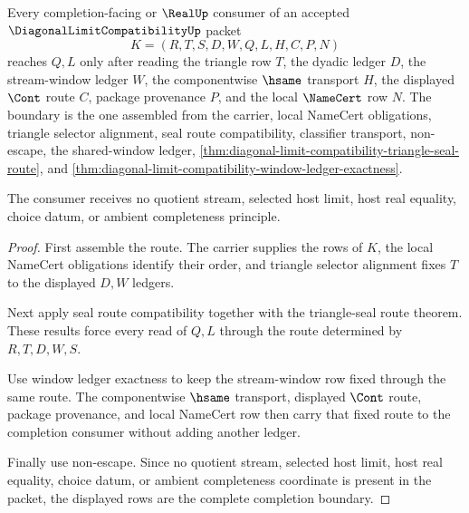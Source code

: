 \begin{theorem}
\label{thm:diagonal-limit-compatibility-completion-boundary}
Every completion-facing or $\RealUp$ consumer of an accepted $\DiagonalLimitCompatibilityUp$ packet
$$
K=(R,T,S,D,W,Q,L,H,C,P,N)
$$
reaches $Q,L$ only after reading the triangle row $T$, the dyadic ledger $D$, the stream-window ledger $W$, the componentwise $\hsame$ transport $H$, the displayed $\Cont$ route $C$, package provenance $P$, and the local $\NameCert$ row $N$. The boundary is the one assembled from the carrier, local NameCert obligations, triangle selector alignment, seal route compatibility, classifier transport, non-escape, the shared-window ledger, \autoref{thm:diagonal-limit-compatibility-triangle-seal-route}, and \autoref{thm:diagonal-limit-compatibility-window-ledger-exactness}.

The consumer receives no quotient stream, selected host limit, host real equality, choice datum, or ambient completeness principle.
\end{theorem}
\begin{proof}
First assemble the route. The carrier supplies the rows of $K$, the local NameCert obligations identify their order, and triangle selector alignment fixes $T$ to the displayed $D,W$ ledgers.

Next apply seal route compatibility together with the triangle-seal route theorem. These results force every read of $Q,L$ through the route determined by $R,T,D,W,S$.

Use window ledger exactness to keep the stream-window row fixed through the same route. The componentwise $\hsame$ transport, displayed $\Cont$ route, package provenance, and local NameCert row then carry that fixed route to the completion consumer without adding another ledger.

Finally use non-escape. Since no quotient stream, selected host limit, host real equality, choice datum, or ambient completeness coordinate is present in the packet, the displayed rows are the complete completion boundary.
\end{proof}

